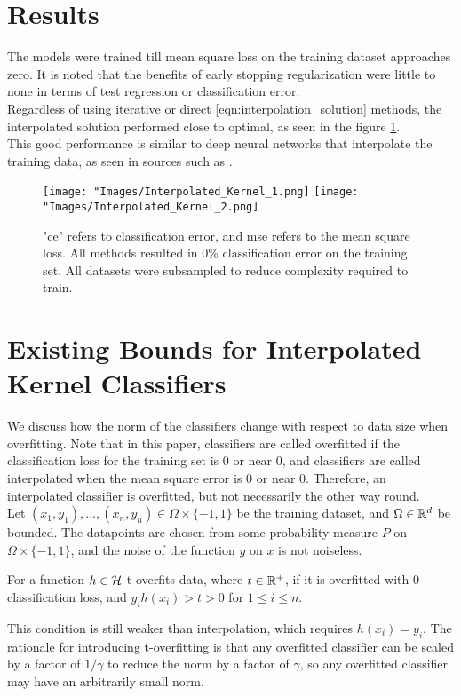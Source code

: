 \documentclass[twoside]{memoir}
\begin{document}
\section{Results}
The models were trained till mean square loss on the training dataset approaches zero. It is noted that the benefits of early stopping regularization were little to none in terms of test regression or classification error.\\
Regardless of using iterative or direct \ref{eqn:interpolation_solution} methods, the interpolated solution performed close to optimal, as seen in the figure \ref{fig:Interpolated_Kernel}.\\
This good performance is similar to deep neural networks that interpolate the training data, as seen in sources such as \cite{Zhang_Deep_Learning}.

\begin{figure}
	\centering
	\texttt{[image: "Images/Interpolated\_Kernel\_1.png]}
	\texttt{[image: "Images/Interpolated\_Kernel\_2.png]}
	\par
	\caption{"ce" refers to classification error, and mse refers to the mean square loss. All methods resulted in 0\% classification error on the training set. All datasets were subsampled to reduce complexity required to train.} \label{fig:Interpolated_Kernel}
\end{figure}

\section{Existing Bounds for Interpolated Kernel Classifiers} \label{sec:BoundsKernel}
We discuss how the norm of the classifiers change with respect to data size when overfitting. Note that in this paper, classifiers are called overfitted if the classification loss for the training set is 0 or near 0, and classifiers are called interpolated when the mean square error is 0 or near 0. Therefore, an interpolated classifier is overfitted, but not necessarily the other way round.\\
Let $(x_1, y_1),..., (x_n, y_n) \in \Omega \times \{-1, 1\}$ be the training dataset, and $\Omega \in \mathbb{R}^d$ be bounded. The datapoints are chosen from some probability measure $P$ on $\Omega \times \{-1, 1\}$, and the noise of the function $y$ on $x$ is not noiseless.
\begin{defn}
	For a function $h \in \mathcal{H}$ t-overfits data, where $t \in \mathbb{R}^+$, if it is overfitted with 0 classification loss, and $y_ih(x_i) > t > 0$ for $1\leq i \leq n$.
\end{defn}
This condition is still weaker than interpolation, which requires $h(x_i) = y_i$. The rationale for introducing t-overfitting is that any overfitted classifier can be scaled by a factor of $1/\gamma$ to reduce the norm by a factor of $\gamma$, so any overfitted classifier may have an arbitrarily small norm.
\end{document}
